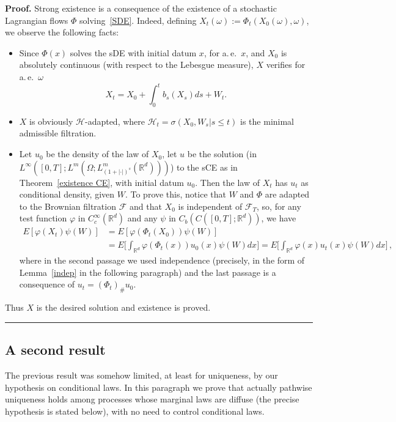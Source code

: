 \documentclass[a4paper,10pt]{article}
\newenvironment{proof}[1][Proof]{\noindent\textbf{#1.} }{\ \rule{0.5em}{0.5em}}
\newcommand{\mr}{\mathbb{R}}
\newcommand{\mc}{\mathcal}
\begin{document}
\begin{proof}
Strong existence is a consequence of the existence of a stochastic Lagrangian flows $\Phi$ solving~\eqref{SDE}. Indeed, defining $X_t(\omega):=\Phi_t(X_0(\omega),\omega)$, we observe the following facts:
\begin{itemize}
\item Since $\Phi(x)$ solves the sDE with initial datum $x$, for a.\,e.\ $x$, and $X_0$ is absolutely continuous (with respect to the Lebesgue measure), $X$ verifies for a.\,e.\ $\omega$
\begin{equation*}
X_t=X_0+\int^t_0b_s (X_s)ds+W_t.
\end{equation*}
\item $X$ is obviously $\mc{H}$-adapted, where $\mc{H}_t=\sigma(X_0,W_s|s\le t)$ is the minimal admissible filtration.
\item Let $u_0$ be the density of the law of $X_0$, let $u$ be the solution (in $L^\infty([0,T];L^m(\Omega;L^m_{(1+|\cdot|)^s}(\mr^d)))$) to the sCE as in Theorem~\ref{existence CE}, with initial datum $u_0$. Then the law of $X_t$ has $u_t$ as conditional density, given $W$. To prove this, notice that $W$ and $\Phi$ are adapted to the Brownian filtration $\mc{F}$ and that $X_0$ is independent of $\mc{F}_T$, so, for any test function $\varphi$ in $C_c^\infty(\mr^d)$ and any $\psi$ in $C_b(C([0,T];\mr^d))$, we have
\begin{align*}
E[\varphi(X_t)\psi(W)] & =E[\varphi(\Phi_t(X_0))\psi(W)]  \\
  & = E\Big[\int_{\mr^d}\varphi(\Phi_t(x))u_0(x)\psi(W)dx\Big] =E\Big[\int_{\mr^d}\varphi(x)u_t(x)\psi(W)dx\Big]\, ,
\end{align*}
where in the second passage we used independence (precisely, in the form of Lemma~\ref{indep} in the following paragraph) and the last passage is a consequence of $u_t=(\Phi_t)_\#u_0$.
\end{itemize}
Thus $X$ is the desired solution and existence is proved.
\end{proof}


\subsection{A second result}\label{secondpathwise}

The previous result was somehow limited, at least for uniqueness, by our hypothesis on conditional laws. In this paragraph we prove that actually pathwise uniqueness holds among processes whose marginal laws are diffuse (the precise hypothesis is stated below), with no need to control conditional laws.
\end{document}
